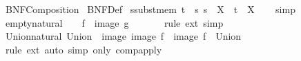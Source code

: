 %
\begin{isabellebody}%
%
%
\isadelimdocument
%
\endisadelimdocument
%
\isatagdocument
%
\isamarkuptrue%
%
\endisatagdocument
{\isafolddocument}%
%
\isadelimdocument
%
\endisadelimdocument
%
\isadelimtheory
%
\endisadelimtheory
%
\isatagtheory
{}\isamarkupfalse%
\ BNF{\isacharunderscore}{\kern0pt}Composition\isanewline
{}\ BNF{\isacharunderscore}{\kern0pt}Def\isanewline
{}%
\endisatagtheory
{\isafoldtheory}%
%
\isadelimtheory
\isanewline
%
\endisadelimtheory
\isanewline
{}\isamarkupfalse%
\ ssubst{\isacharunderscore}{\kern0pt}mem{\isacharcolon}{\kern0pt}\ {\isachardoublequoteopen}{\isasymlbrakk}t\ {\isacharequal}{\kern0pt}\ s{\isacharsemicolon}{\kern0pt}\ s\ {\isasymin}\ X{\isasymrbrakk}\ {\isasymLongrightarrow}\ t\ {\isasymin}\ X{\isachardoublequoteclose}\isanewline
%
\isadelimproof
\ \ %
\endisadelimproof
%
\isatagproof
{}\isamarkupfalse%
\ simp%
\endisatagproof
{\isafoldproof}%
%
\isadelimproof
\isanewline
%
\endisadelimproof
\isanewline
{}\isamarkupfalse%
\ empty{\isacharunderscore}{\kern0pt}natural{\isacharcolon}{\kern0pt}\ {\isachardoublequoteopen}{\isacharparenleft}{\kern0pt}{\isasymlambda}{\isacharunderscore}{\kern0pt}{\isachardot}{\kern0pt}\ {\isacharbraceleft}{\kern0pt}{\isacharbraceright}{\kern0pt}{\isacharparenright}{\kern0pt}\ {\isasymcirc}\ f\ {\isacharequal}{\kern0pt}\ image\ g\ {\isasymcirc}\ {\isacharparenleft}{\kern0pt}{\isasymlambda}{\isacharunderscore}{\kern0pt}{\isachardot}{\kern0pt}\ {\isacharbraceleft}{\kern0pt}{\isacharbraceright}{\kern0pt}{\isacharparenright}{\kern0pt}{\isachardoublequoteclose}\isanewline
%
\isadelimproof
\ \ %
\endisadelimproof
%
\isatagproof
{}\isamarkupfalse%
\ {\isacharparenleft}{\kern0pt}rule\ ext{\isacharparenright}{\kern0pt}\ simp%
\endisatagproof
{\isafoldproof}%
%
\isadelimproof
\isanewline
%
\endisadelimproof
\isanewline
{}\isamarkupfalse%
\ Union{\isacharunderscore}{\kern0pt}natural{\isacharcolon}{\kern0pt}\ {\isachardoublequoteopen}Union\ {\isasymcirc}\ image\ {\isacharparenleft}{\kern0pt}image\ f{\isacharparenright}{\kern0pt}\ {\isacharequal}{\kern0pt}\ image\ f\ {\isasymcirc}\ Union{\isachardoublequoteclose}\isanewline
%
\isadelimproof
\ \ %
\endisadelimproof
%
\isatagproof
{}\isamarkupfalse%
\ {\isacharparenleft}{\kern0pt}rule\ ext{\isacharparenright}{\kern0pt}\ {\isacharparenleft}{\kern0pt}auto\ simp\ only{\isacharcolon}{\kern0pt}\ comp{\isacharunderscore}{\kern0pt}apply{\isacharparenright}{\kern0pt}%

\end{isabellebody}
